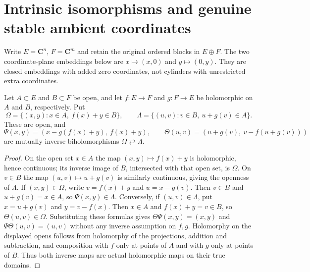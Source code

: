 \section{Intrinsic isomorphisms and genuine stable ambient coordinates}

Write $E=\mathbf C^n$, $F=\mathbf C^m$ and retain the original ordered blocks in $E\oplus F$. The two coordinate-plane embeddings below are $x\mapsto(x,0)$ and $y\mapsto(0,y)$. They are closed embeddings with added zero coordinates, not cylinders with unrestricted extra coordinates.

\begin{lemma}
\label{hir:actual-stable-ambient-shears}
\leanok
Let $A\subset E$ and $B\subset F$ be open, and let $f:E\to F$ and $g:F\to E$ be holomorphic on $A$ and $B$, respectively. Put
\[
 \Omega=\{(x,y):x\in A,\ f(x)+y\in B\},\qquad
 \Lambda=\{(u,v):v\in B,\ u+g(v)\in A\}.
\]
These are open, and
\[
 \Psi(x,y)=(x-g(f(x)+y),\ f(x)+y),\qquad
 \Theta(u,v)=(u+g(v),\ v-f(u+g(v)))
\]
are mutually inverse biholomorphisms $\Omega\rightleftarrows\Lambda$.
\end{lemma}
\begin{proof}
On the open set $x\in A$ the map $(x,y)\mapsto f(x)+y$ is holomorphic, hence continuous; its inverse image of $B$, intersected with that open set, is $\Omega$. On $v\in B$ the map $(u,v)\mapsto u+g(v)$ is similarly continuous, giving the openness of $\Lambda$. If $(x,y)\in\Omega$, write $v=f(x)+y$ and $u=x-g(v)$. Then $v\in B$ and $u+g(v)=x\in A$, so $\Psi(x,y)\in\Lambda$. Conversely, if $(u,v)\in\Lambda$, put $x=u+g(v)$ and $y=v-f(x)$. Then $x\in A$ and $f(x)+y=v\in B$, so $\Theta(u,v)\in\Omega$. Substituting these formulas gives $\Theta\Psi(x,y)=(x,y)$ and $\Psi\Theta(u,v)=(u,v)$ without any inverse assumption on $f,g$. Holomorphy on the displayed opens follows from holomorphy of the projections, addition and subtraction, and composition with $f$ only at points of $A$ and with $g$ only at points of $B$. Thus both inverse maps are actual holomorphic maps on their true domains.
\end{proof}

